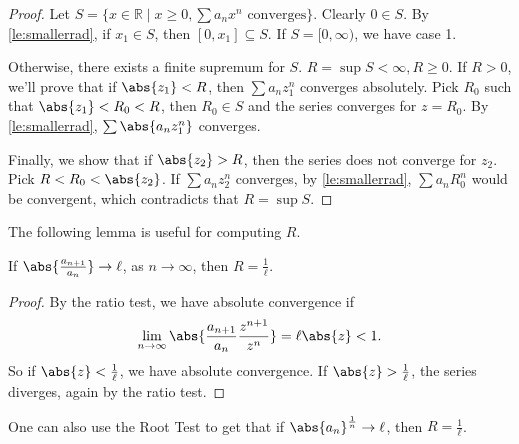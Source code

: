 \begin{proof}
    Let \(S = \{x \in \mathbb{R}\mid x \geq 0, \sum a_n x^n\text{ converges}\}\). Clearly \(0 \in S\). By \eqref{le:smallerrad}, if \(x_1 \in S\), then \([0, x_1] \subseteq S\). If \(S = [0, \infty)\), we have case 1.

    Otherwise, there exists a finite supremum for \(S\). \(R = \sup S < \infty, R \geq 0\). If \(R > 0\), we'll prove that if \(\abs{z_1} < R\), then \(\sum a_n z_1^n\) converges absolutely. Pick \(R_0\) such that \(\abs{z_1} < R_0 < R\), then \(R_0 \in S\) and the series converges for \(z = R_0\). By \eqref{le:smallerrad}, \(\sum \abs{a_{n}z_1^n}\) converges.

    Finally, we show that if \(\abs{z_2} > R\), then the series does not converge for \(z_2\). Pick \(R < R_0 < \abs{z_2} \). If \(\sum a_n z_2^n\) converges, by \eqref{le:smallerrad}, \(\sum a_n R_0^n\) would be convergent, which contradicts that \(R = \sup S\).
\end{proof}
The following lemma is useful for computing \(R\).
\begin{lemma}{}{}
    If \(\abs{\frac{a_{n+1}}{a_n}}\to \ell \), as \(n \to \infty\), then \(R = \frac{1}{\ell}\).
\end{lemma}
\begin{proof}
    By the ratio test, we have absolute convergence if
    \[
        \lim\limits_{n \to \infty} \abs{\frac{a_{n+1}}{a_n}\frac{z^{n+1}}{z^n}} = \ell \abs{z} < 1.
    \]
    So if \(\abs{z} < \frac{1}{\ell}\), we have absolute convergence. If \(\abs{z} > \frac{1}{\ell}\), the series diverges, again by the ratio test.
\end{proof}
\begin{remark}
    One can also use the Root Test to get that if \(\abs{a_n}^{\frac{1}{n}} \to \ell\), then \(R = \frac{1}{\ell}\).
\end{remark}
